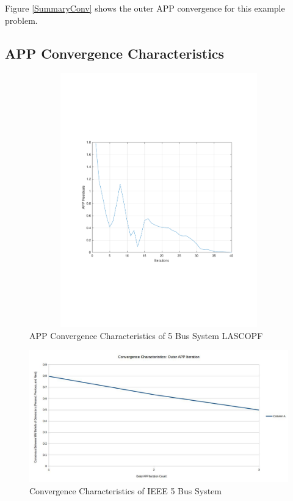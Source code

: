 \documentclass[preprint,12pt,3p]{elsarticle}
\begin{document}
\fi
Figure \ref{SummaryConv} shows the outer APP convergence for this example problem.
\iffalse
\subsection{APP Convergence Characteristics}
\begin{figure}
\begin{center}
\vspace*{-2cm}
\hspace*{2cm}
\includegraphics[height=11cm,width=18cm]{APP Residuals.pdf}
\caption{APP Convergence Characteristics of 5 Bus System LASCOPF}
\label{fig:5BusLASCOPF}
\end{center}
\end{figure}
\begin{figure}
\begin{center}
\includegraphics[width=0.92\linewidth,trim=5mm 12mm 5mm 5mm, clip]{N-1_SCOPF_5_Bus.jpg}
\caption{Convergence Characteristics of IEEE 5 Bus System}
\label{5Conv}
\end{center}
\end{figure}
\end{document}
